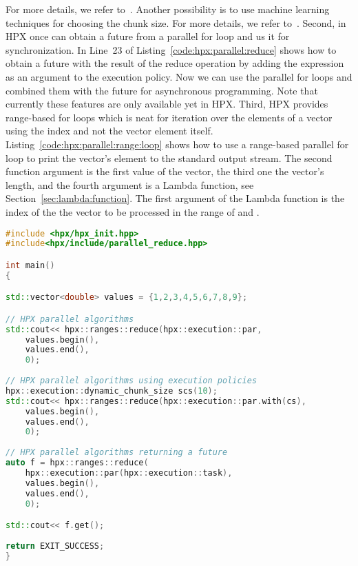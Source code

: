 \vspace{0.25cm}
For more details, we refer to~\cite{grubel2015performance}. Another possibility is to use machine learning techniques for choosing the chunk size. For more details, we refer to~\cite{shirzad2019scheduling}. Second, in HPX once can obtain a future from a parallel for loop and us it for synchronization. In Line~23 of Listing~\ref{code:hpx:parallel:reduce} shows how to obtain a future with the result of the reduce operation by adding the expression  as an argument to the execution policy. Now we can use the parallel for loops and combined them with the future for asynchronous programming. Note that currently these features are only available yet in HPX. Third, HPX provides range-based for loops which is neat for iteration over the elements of a vector using the index and not the vector element itself. Listing~\ref{code:hpx:parallel:range:loop} shows how to use a range-based parallel for loop to print the vector's element to the standard output stream.  The second function argument is the first value of the vector, the third one the vector's length, and the fourth argument is a Lambda function, see Section~\ref{sec:lambda:function}. The first argument of the Lambda function is the index of the the vector to be processed in the range of  and .


\begin{lstlisting}[language=c++,caption={Parallel algorithms (reduce) using HPX.\label{code:hpx:parallel:reduce}},float,floatplacement=htb]
#include <hpx/hpx_init.hpp>
#include<hpx/include/parallel_reduce.hpp>

int main()
{

std::vector<double> values = {1,2,3,4,5,6,7,8,9};

// HPX parallel algorithms
std::cout<< hpx::ranges::reduce(hpx::execution::par,
	values.begin(),
	values.end(),
	0);
	
// HPX parallel algorithms using execution policies
hpx::execution::dynamic_chunk_size scs(10);
std::cout<< hpx::ranges::reduce(hpx::execution::par.with(cs),
	values.begin(),
	values.end(),
	0);
	
// HPX parallel algorithms returning a future
auto f = hpx::ranges::reduce(
	hpx::execution::par(hpx::execution::task),
	values.begin(),
	values.end(),
	0);

std::cout<< f.get();
  
return EXIT_SUCCESS;
}

\end{lstlisting}

